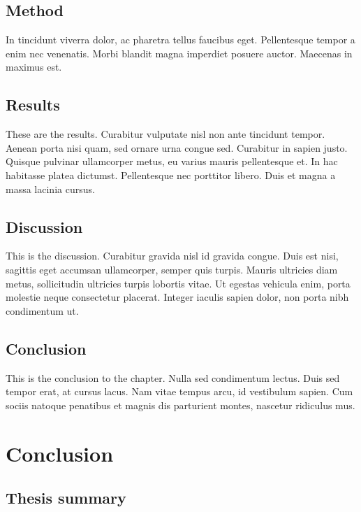\documentclass[12pt,a4paper,]{report}
\begin{document}
\hypertarget{method}{%
\section{Method}\label{method}}

In tincidunt viverra dolor, ac pharetra tellus faucibus eget.
Pellentesque tempor a enim nec venenatis. Morbi blandit magna imperdiet
posuere auctor. Maecenas in maximus est.

\hypertarget{results}{%
\section{Results}\label{results}}

These are the results. Curabitur vulputate nisl non ante tincidunt
tempor. Aenean porta nisi quam, sed ornare urna congue sed. Curabitur in
sapien justo. Quisque pulvinar ullamcorper metus, eu varius mauris
pellentesque et. In hac habitasse platea dictumst. Pellentesque nec
porttitor libero. Duis et magna a massa lacinia cursus.

\hypertarget{discussion}{%
\section{Discussion}\label{discussion}}

This is the discussion. Curabitur gravida nisl id gravida congue. Duis
est nisi, sagittis eget accumsan ullamcorper, semper quis turpis. Mauris
ultricies diam metus, sollicitudin ultricies turpis lobortis vitae. Ut
egestas vehicula enim, porta molestie neque consectetur placerat.
Integer iaculis sapien dolor, non porta nibh condimentum ut.

\hypertarget{conclusion-2}{%
\section{Conclusion}\label{conclusion-2}}

This is the conclusion to the chapter. Nulla sed condimentum lectus.
Duis sed tempor erat, at cursus lacus. Nam vitae tempus arcu, id
vestibulum sapien. Cum sociis natoque penatibus et magnis dis parturient
montes, nascetur ridiculus mus.

\hypertarget{sec:conclusion}{%
\chapter{Conclusion}\label{sec:conclusion}}

\hypertarget{thesis-summary}{%
\section{Thesis summary}\label{thesis-summary}}
\end{document}

